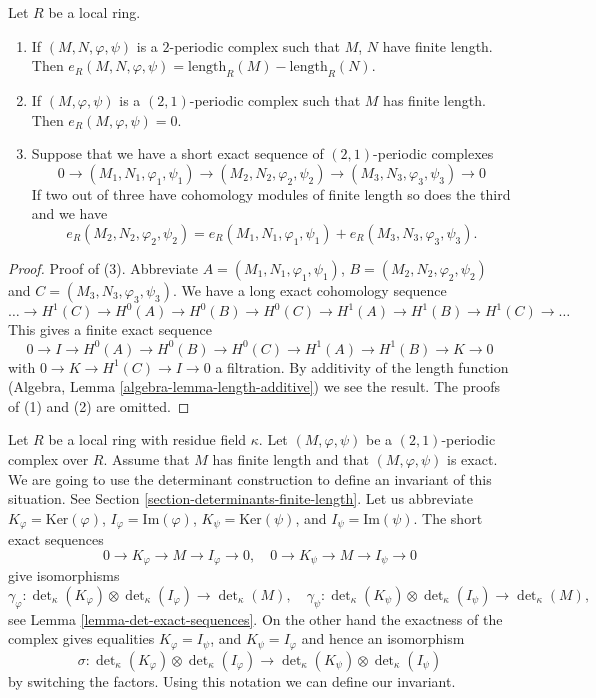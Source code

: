 \begin{lemma}
\label{lemma-periodic-length}
Let $R$ be a local ring.
\begin{enumerate}
\item If $(M, N, \varphi, \psi)$ is a $2$-periodic complex
such that $M$, $N$ have finite length. Then
$e_R(M, N, \varphi, \psi) = \text{length}_R(M) - \text{length}_R(N)$.
\item If $(M, \varphi, \psi)$ is a $(2, 1)$-periodic complex
such that $M$ has finite length. Then
$e_R(M, \varphi, \psi) = 0$.
\item Suppose that we have a short exact sequence of
$(2, 1)$-periodic complexes
$$
0 \to (M_1, N_1, \varphi_1, \psi_1)
\to (M_2, N_2, \varphi_2, \psi_2)
\to (M_3, N_3, \varphi_3, \psi_3)
\to 0
$$
If two out of three have cohomology modules of finite length so does
the third and we have
$$
e_R(M_2, N_2, \varphi_2, \psi_2) =
e_R(M_1, N_1, \varphi_1, \psi_1) +
e_R(M_3, N_3, \varphi_3, \psi_3).
$$
\end{enumerate}
\end{lemma}

\begin{proof}
Proof of (3). Abbreviate $A = (M_1, N_1, \varphi_1, \psi_1)$,
$B = (M_2, N_2, \varphi_2, \psi_2)$ and $C = (M_3, N_3, \varphi_3, \psi_3)$.
We have a long exact cohomology sequence
$$
\ldots
\to H^1(C)
\to H^0(A)
\to H^0(B)
\to H^0(C)
\to H^1(A)
\to H^1(B)
\to H^1(C)
\to \ldots
$$
This gives a finite exact sequence
$$
0 \to I
\to H^0(A)
\to H^0(B)
\to H^0(C)
\to H^1(A)
\to H^1(B)
\to K \to 0
$$
with $0 \to K \to H^1(C) \to I \to 0$ a filtration. By additivity of
the length function (Algebra, Lemma \ref{algebra-lemma-length-additive})
we see the result.
The proofs of (1) and (2) are omitted.
\end{proof}

\noindent
Let $R$ be a local ring with residue field $\kappa$.
Let $(M, \varphi, \psi)$ be a $(2, 1)$-periodic complex over $R$.
Assume that $M$ has finite length and that $(M, \varphi, \psi)$ is
exact. We are going to use the determinant construction to define
an invariant of this situation. See
Section \ref{section-determinants-finite-length}.
Let us abbreviate
$K_\varphi = \text{Ker}(\varphi)$,
$I_\varphi = \text{Im}(\varphi)$,
$K_\psi = \text{Ker}(\psi)$, and
$I_\psi = \text{Im}(\psi)$.
The short exact sequences
$$
0 \to K_\varphi \to M \to I_\varphi \to 0,\quad
0 \to K_\psi \to M \to I_\psi \to 0
$$
give isomorphisms
$$
\gamma_\varphi :
\det\nolimits_\kappa(K_\varphi)
\otimes
\det\nolimits_\kappa(I_\varphi)
\longrightarrow
\det\nolimits_\kappa(M), \quad
\gamma_\psi :
\det\nolimits_\kappa(K_\psi)
\otimes
\det\nolimits_\kappa(I_\psi)
\longrightarrow
\det\nolimits_\kappa(M),
$$
see Lemma \ref{lemma-det-exact-sequences}.
On the other hand the exactness of the complex gives equalities
$K_\varphi = I_\psi$, and $K_\psi = I_\varphi$
and hence an isomorphism
$$
\sigma :
\det\nolimits_\kappa(K_\varphi)
\otimes
\det\nolimits_\kappa(I_\varphi)
\longrightarrow
\det\nolimits_\kappa(K_\psi)
\otimes
\det\nolimits_\kappa(I_\psi)
$$
by switching the factors. Using this notation we can define our invariant.

